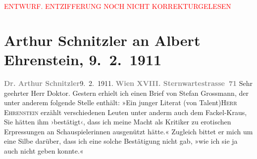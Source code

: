
\begin{center}
            \textcolor{red}{ENTWURF. ENTZIFFERUNG NOCH NICHT KORREKTURGELESEN}
                      \end{center}
            
               \section[Arthur Schnitzler an Albert Ehrenstein, 9. 2. 1911]{ Arthur Schnitzler an Albert Ehrenstein, 9. 2. 1911}\nopagebreak{}\rehead{ }\begin{ledgroupsized}[t]{13cm}\normalsize\beginnumbering{} \toendnotes[C]{\smallbreak\pagebreak[2]} 
\pstart
           {\pb}\textcolor{gray}{\textbf{Dr. Arthur Schnitzler}}\hfill 9. 2. 1911.\pend
           \pstart
           \textcolor{gray}{\textbf{Wien XVIII. Sternwartestrasse 71}}\pend
           \pstart{}Sehr geehrter Herr Doktor.\pend\pstart
           Gestern erhielt ich einen Brief von Stefan
                        Grossmann, der unter anderem folgende Stelle enthält: »Ein junger
                    Literat \introOben{}(\introOben{}von Talent\introOben{})\introOben{}{ }\introOben{}\textsc{Herr Ehrenstein}\introOben{} erzählt verschiedenen Leuten unter anderm auch dem Fackel-Kraus, Sie hätten
                    ihm ›bestätigt‹, dass ich meine Macht als Kritiker zu erotischen Erpressungen an
                    Schauspielerinnen ausgenützt hätte.« Zugleich bittet er mich um eine Silbe
                    darüber, dass ich eine solche Bestätigung nicht gab, \introOben{}»\introOben{}wie ich sie ja auch nicht geben konnte.\introOben{}«\introOben{}\pend

\end{ledgroupsized}
